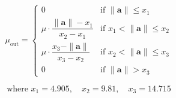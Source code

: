 \documentclass[bare_jrnl_transmag]{subfiles}
\begin{document}
\[
\mu_{\text{out}} =
\begin{cases}
0 & \text{if } \|\mathbf{a}\| \leq x_1 \\
\mu \cdot \dfrac{\|\mathbf{a}\| - x_1}{x_2 - x_1} & \text{if } x_1 < \|\mathbf{a}\| \leq x_2 \\
\mu \cdot \dfrac{x_3 - \|\mathbf{a}\|}{x_3 - x_2} & \text{if } x_2 < \|\mathbf{a}\| \leq x_3 \\
0 & \text{if } \|\mathbf{a}\| > x_3
\end{cases}
\]

\[
\text{where } x_1 = 4.905, \quad x_2 = 9.81, \quad x_3 = 14.715
\]
\end{document}
